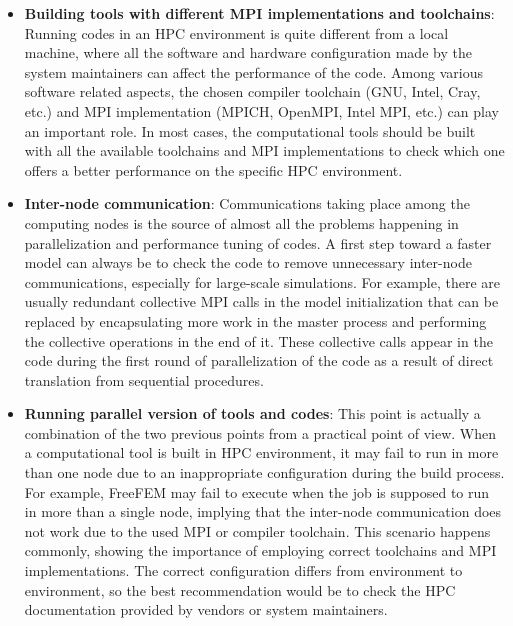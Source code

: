\begin{itemize}
\item
\textbf{Building tools with different MPI implementations and toolchains}: Running codes in an HPC environment is quite different from a local machine, where all the software and hardware configuration made by the system maintainers can affect the performance of the code. Among various software related aspects, the chosen compiler toolchain (GNU, Intel, Cray, etc.) and MPI implementation (MPICH, OpenMPI, Intel MPI, etc.) can play an important role. In most cases, the computational tools should be built with all the available toolchains and MPI implementations to check which one offers a better performance on the specific HPC environment. 
\item
\textbf{Inter-node communication}: Communications taking place among the computing nodes is the source of almost all the problems happening in parallelization and performance tuning of codes. A first step toward a faster model can always be to check the code to remove unnecessary inter-node communications, especially for large-scale simulations. For example, there are usually redundant collective MPI calls in the model initialization that can be replaced by encapsulating more work in the master process and performing the collective operations in the end of it. These collective calls appear in the code during the first round of parallelization of the code as a result of direct translation from sequential procedures.
\item
\textbf{Running parallel version of tools and codes}: This point is actually a combination of the two previous points from a practical point of view. When a computational tool is built in HPC environment, it may fail to run in more than one node due to an inappropriate configuration during the build process. For example, FreeFEM may fail to execute when the job is supposed to run in more than a single node, implying that the inter-node communication does not work due to the used MPI or compiler toolchain. This scenario happens commonly, showing the importance of employing correct toolchains and MPI implementations. The correct configuration differs from environment to environment, so the best recommendation would be to check the HPC documentation provided by vendors or system maintainers.
\end{itemize}


